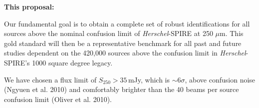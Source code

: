 \documentclass[12pt,a4paper]{article}
\newcommand{\herschel}{{\it Herschel}}
\newcommand{\ea}{et~al.}
\newcommand{\micron}{$\mu$m}
\begin{document}




{\bf This proposal:}
%

Our fundamental goal is to obtain a complete set of robust identifications for all sources above the nominal confusion limit of \herschel-SPIRE at 250 \micron . This gold standard will then be a representative benchmark for all past and future studies dependent on the 420,000 sources above the confusion limit in \herschel-SPIRE's 1000 square degree legacy.

We have chosen a flux limit of $S_{250}>35$\,mJy, which is $\sim 6\sigma$, above confusion noise (Ngyuen et al. 2010) and comfortably brighter than the 40 beams per source confusion limit (Oliver et al. 2010). 
\end{document}
